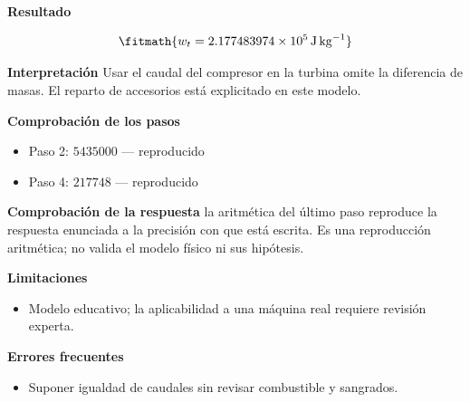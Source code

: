 \documentclass[10pt,openany]{book}
\begin{document}
\begin{tcolorbox}[title={Problema resuelto 4}, studiumworked, breakable]
\noindent\textbf{Resultado}

\[
\fitmath{w_t=2.177483974\times10^{5}\,\mathrm{J}\,\mathrm{kg}^{-1}}
\]

\noindent\textbf{Interpretación}
Usar el caudal del compresor en la turbina omite la diferencia de masas. El reparto de accesorios está explicitado en este modelo.

\noindent\textbf{Comprobación de los pasos}
\begin{itemize}
\item Paso 2: $5435000$ — reproducido
\item Paso 4: $217748$ — reproducido
\end{itemize}

\noindent\textbf{Comprobación de la respuesta} la aritmética del último paso reproduce la respuesta enunciada a la precisión con que está escrita. Es una reproducción aritmética; no valida el modelo físico ni sus hipótesis.

\noindent\textbf{Limitaciones}
\begin{itemize}
\item Modelo educativo; la aplicabilidad a una máquina real requiere revisión experta.
\end{itemize}

\noindent\textbf{Errores frecuentes}
\begin{itemize}
\item Suponer igualdad de caudales sin revisar combustible y sangrados.
\end{itemize}
\end{tcolorbox}
\end{document}
